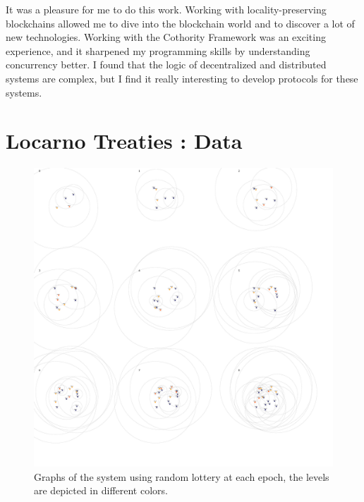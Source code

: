 \documentclass[a4paper,11pt,twoside,openright]{report}
\begin{document}
It was a pleasure for me to do this work. Working with locality-preserving
blockchains allowed me to dive into the blockchain world and to discover a lot
of new technologies. Working with the Cothority Framework was an exciting
experience, and it sharpened my programming skills by understanding concurrency better. I found that the logic of decentralized and distributed systems
are complex, but I find it really interesting to develop protocols for these
systems. 


\cleardoublepage {} {}
\printbibliography


\appendix %

\chapter{Locarno Treaties : Data} \label{app:LocarnoTreaties-data}

\begin{figure}[!h] 
\centering
\includegraphics[width=350pt]{figures/LocarnoTreaties-RandomFinal}
\caption{Graphs of the system using random lottery at each epoch, the levels are depicted in different colors.}
\label{fig:LocarnoTreaties-RandomFinal}
\end{figure}
\end{document}
